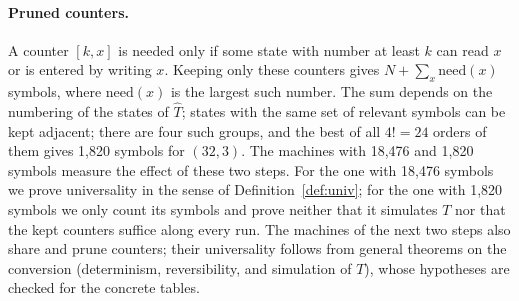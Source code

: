 \documentclass{article}
\theoremstyle{definition}
\theoremstyle{remark}
\begin{document}
\paragraph{Pruned counters.}
A counter $[k,x]$ is needed only if some state with number at least $k$ can read $x$ or is entered by writing $x$.
Keeping only these counters gives $N+\sum_x\mathrm{need}(x)$ symbols, where $\mathrm{need}(x)$ is the largest such number.
The sum depends on the numbering of the states of $\hat T$; states with the same set of relevant symbols can be kept adjacent; there are four such groups, and the best of all $4!=24$ orders of them gives 1,820 symbols for $(32,3)$.
The machines with 18,476 and 1,820 symbols measure the effect of these two steps. For the one with 18,476 symbols we prove universality in the sense of Definition~\ref{def:univ}; for the one with 1,820 symbols we only count its symbols and prove neither that it simulates $T$ nor that the kept counters suffice along every run.
The machines of the next two steps also share and prune counters; their universality follows from general theorems on the conversion (determinism, reversibility, and simulation of $T$), whose hypotheses are checked for the concrete tables.
\end{document}
